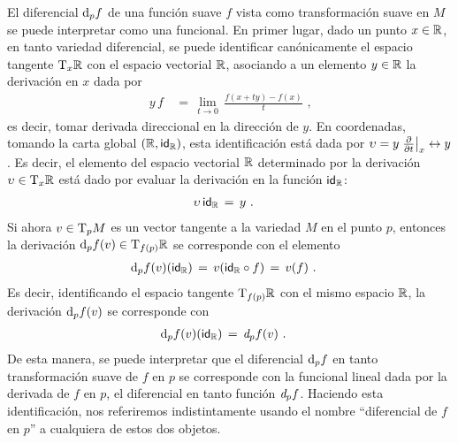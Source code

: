 El diferencial $\diferencial[p]{f}$ de una funci\'{o}n suave $f$ vista
como transformaci\'{o}n suave en $M$ se puede interpretar como una
funcional. En primer lugar, dado un punto $x\in\bb{R}$, en tanto variedad
diferencial, se puede identificar can\'{o}nicamente el espacio tangente
$\tangente[x]{\bb{R}}$ con el espacio vectorial $\bb{R}$, asociando a
un elemento $y\in\bb{R}$ la derivaci\'{o}n en $x$ dada por
\begin{align*}
	y\,f & \,=\,\lim_{t\to 0}\,\frac{f(x+ty)-f(x)}{t}
	\text{ ,}
\end{align*}
%
es decir, tomar derivada direccional en la direcci\'{o}n de $y$. En
coordenadas, tomando la carta global $(\bb{R},\id[\bb{R}])$, esta
identificaci\'{o}n est\'{a} dada por $\upsilon =y\gancho[x]{t}%
\leftrightarrow y$. Es decir, el elemento del espacio vectorial $\bb{R}$
determinado por la derivaci\'{o}n $\upsilon\in\tangente[x]{\bb{R}}$ est\'{a}
dado por evaluar la derivaci\'{o}n en la funci\'{o}n $\id[\bb{R}]$:
\begin{align*}
	\upsilon\,\id[\bb{R}] & \,=\,y
	\text{ .}
\end{align*}
%
Si ahora $v\in\tangente[p]{M}$ es un vector tangente a la variedad $M$ en el
punto $p$, entonces la derivaci\'{o}n $\diferencial[p]{f}(v)\in%
\tangente[f(p)]{\bb{R}}$ se corresponde con el elemento
\begin{align*}
	\diferencial[p]{f}(v)(\id[\bb{R}]) & \,=\,v(\id[\bb{R}]\circ f)
		\,=\,v(f)
	\text{ .}
\end{align*}
%
Es decir, identificando el espacio tangente $\tangente[f(p)]{\bb{R}}$
con el mismo espacio $\bb{R}$, la derivaci\'{o}n $\diferencial[p]{f}(v)$
se corresponde con
\begin{align*}
	\diferencial[p]{f}(v)(\id[\bb{R}]) & \,=\,\derext[p]{f}(v)
	\text{ .}
\end{align*}
%
De esta manera, se puede interpretar que el diferencial $\diferencial[p]{f}$
en tanto transformaci\'{o}n suave de $f$ en $p$ se corresponde con la
funcional lineal dada por la derivada de $f$ en $p$, el diferencial en tanto
funci\'{o}n $\derext[p]{f}$. Haciendo esta identificaci\'{o}n, nos referiremos
indistintamente usando el nombre ``diferencial de $f$ en $p$'' a
cualquiera de estos dos objetos.

